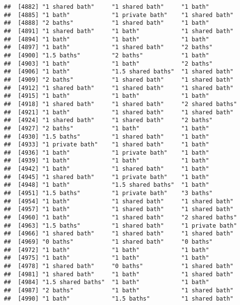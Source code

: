 \documentclass[
]{article}
\begin{document}
\begin{verbatim}
##  [4882] "1 shared bath"     "1 shared bath"     "1 bath"           
##  [4885] "1 bath"            "1 private bath"    "1 shared bath"    
##  [4888] "2 baths"           "1 shared bath"     "1 bath"           
##  [4891] "1 shared bath"     "1 bath"            "1 shared bath"    
##  [4894] "1 bath"            "1 bath"            "1 bath"           
##  [4897] "1 bath"            "1 shared bath"     "2 baths"          
##  [4900] "1.5 baths"         "2 baths"           "1 bath"           
##  [4903] "1 bath"            "1 bath"            "2 baths"          
##  [4906] "1 bath"            "1.5 shared baths"  "1 shared bath"    
##  [4909] "2 baths"           "1 shared bath"     "1 shared bath"    
##  [4912] "1 shared bath"     "1 shared bath"     "1 shared bath"    
##  [4915] "1 bath"            "1 bath"            "1 bath"           
##  [4918] "1 shared bath"     "1 shared bath"     "2 shared baths"   
##  [4921] "1 bath"            "1 shared bath"     "1 shared bath"    
##  [4924] "1 shared bath"     "1 shared bath"     "2 baths"          
##  [4927] "2 baths"           "1 bath"            "1 bath"           
##  [4930] "1.5 baths"         "1 shared bath"     "1 bath"           
##  [4933] "1 private bath"    "1 shared bath"     "1 bath"           
##  [4936] "1 bath"            "1 private bath"    "1 bath"           
##  [4939] "1 bath"            "1 bath"            "1 bath"           
##  [4942] "1 bath"            "1 shared bath"     "1 bath"           
##  [4945] "1 shared bath"     "1 private bath"    "1 bath"           
##  [4948] "1 bath"            "1.5 shared baths"  "1 bath"           
##  [4951] "1.5 baths"         "1 private bath"    "3 baths"          
##  [4954] "1 bath"            "1 shared bath"     "1 shared bath"    
##  [4957] "1 bath"            "1 shared bath"     "1 shared bath"    
##  [4960] "1 bath"            "1 shared bath"     "2 shared baths"   
##  [4963] "1.5 baths"         "1 shared bath"     "1 private bath"   
##  [4966] "1 shared bath"     "1 shared bath"     "1 shared bath"    
##  [4969] "0 baths"           "1 shared bath"     "0 baths"          
##  [4972] "1 bath"            "1 bath"            "1 bath"           
##  [4975] "1 bath"            "1 bath"            "1 bath"           
##  [4978] "1 shared bath"     "0 baths"           "1 shared bath"    
##  [4981] "1 shared bath"     "1 bath"            "1 shared bath"    
##  [4984] "1.5 shared baths"  "1 bath"            "1 bath"           
##  [4987] "2 baths"           "1 bath"            "1 shared bath"    
##  [4990] "1 bath"            "1.5 baths"         "1 shared bath"    

\end{verbatim}
\end{document}
